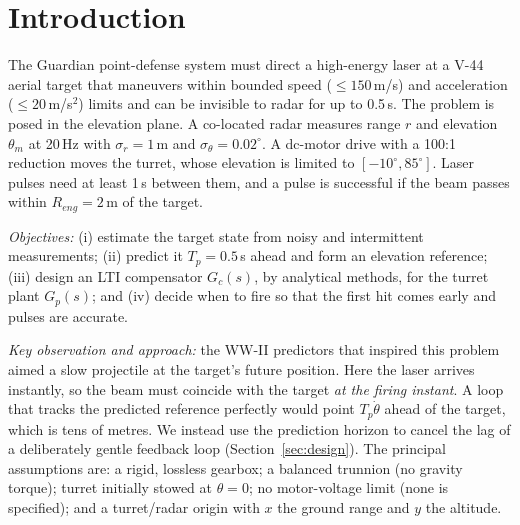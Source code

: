 \documentclass[conference]{IEEEtran}
\newcommand{\Tp}{T_p}
\begin{document}
\section{Introduction}
The Guardian point-defense system must direct a high-energy laser at a V-44
aerial target that maneuvers within bounded speed ($\le150$\,m/s) and
acceleration ($\le20$\,m/s$^2$) limits and can be invisible to radar for up to
0.5\,s. The problem is posed in the elevation plane. A co-located radar measures
range $r$ and elevation $\theta_m$ at 20\,Hz with $\sigma_r=1$\,m and
$\sigma_\theta=0.02^\circ$. A dc-motor drive with a 100:1 reduction moves the turret,
whose elevation is limited to $[-10^\circ,85^\circ]$. Laser pulses need at least
1\,s between them, and a pulse is successful if the beam passes within
$R_{eng}=2$\,m of the target.

\textit{Objectives:} (i) estimate the target state from noisy and intermittent
measurements; (ii) predict it $\Tp=0.5$\,s ahead and form an elevation
reference; (iii) design an LTI compensator $G_c(s)$, by analytical methods, for
the turret plant $G_p(s)$; and (iv) decide when to fire so that the first hit
comes early and pulses are accurate.

\textit{Key observation and approach:} the WW-II predictors that inspired this
problem aimed a slow projectile at the target's future position. Here the laser
arrives instantly, so the beam must coincide with the target \emph{at the firing
instant}. A loop that tracks the predicted reference perfectly would point
$\Tp\dot\theta$ ahead of the target, which is tens of metres. We instead use the
prediction horizon to cancel the lag of a deliberately gentle feedback loop
(Section~\ref{sec:design}). The principal assumptions are: a rigid, lossless
gearbox; a balanced trunnion (no gravity torque); turret initially stowed at
$\theta=0$; no motor-voltage limit (none is specified); and a
turret/radar origin with $x$ the ground range and $y$ the altitude.

\end{document}
